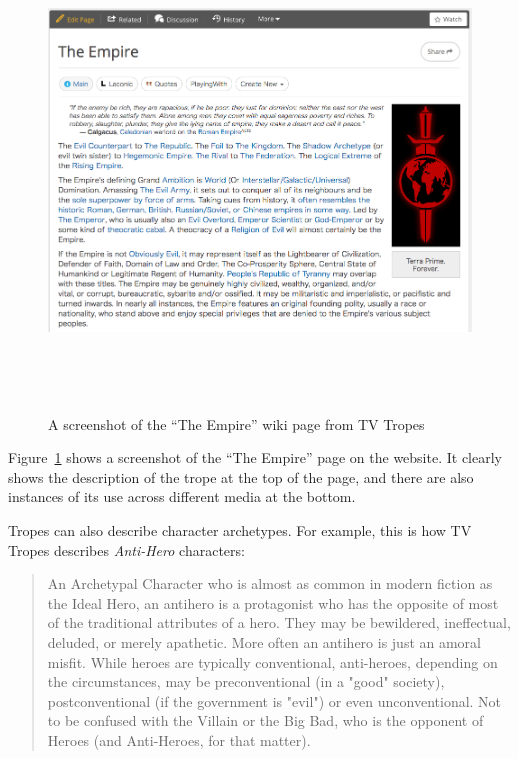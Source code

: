 \begin{figure}[!t]
\centerline{\includegraphics[height=5in]{evilEmpire.png}}
\caption{A screenshot of the ``The Empire'' wiki page from TV Tropes} \label{fig:evil-empire}
\end{figure}

Figure~\ref{fig:evil-empire} shows a screenshot of the ``The Empire'' page on the
website. It clearly shows the description of the trope at the top of the page,
and there are also instances of its use across different media at the bottom.

Tropes can also describe character archetypes. For example, this is how TV
Tropes describes \emph{Anti-Hero} characters:

\begin{quote}
An Archetypal Character who is almost as common in modern fiction as the Ideal Hero, an antihero is a protagonist who has the opposite of most of the traditional attributes of a hero. They may be bewildered, ineffectual, deluded, or merely apathetic. More often an antihero is just an amoral misfit. While heroes are typically conventional, anti-heroes, depending on the circumstances, may be preconventional (in a "good" society), postconventional (if the government is "evil") or even unconventional. Not to be confused with the Villain or the Big Bad, who is the opponent of Heroes (and Anti-Heroes, for that matter).
  \end{quote}

